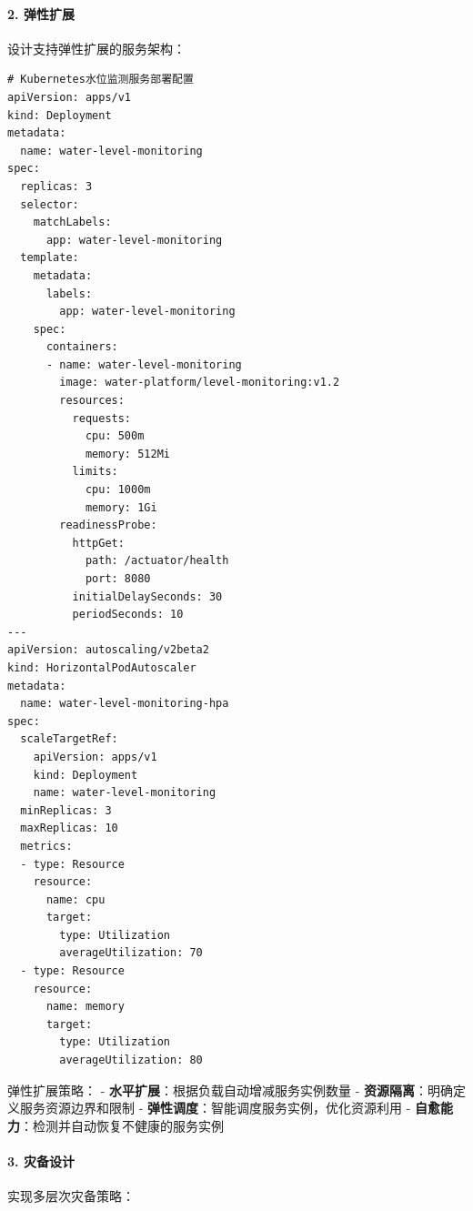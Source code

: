 \paragraph{2. 弹性扩展}\label{ux5f39ux6027ux6269ux5c55}

设计支持弹性扩展的服务架构：

\begin{lstlisting}
# Kubernetes水位监测服务部署配置
apiVersion: apps/v1
kind: Deployment
metadata:
  name: water-level-monitoring
spec:
  replicas: 3
  selector:
    matchLabels:
      app: water-level-monitoring
  template:
    metadata:
      labels:
        app: water-level-monitoring
    spec:
      containers:
      - name: water-level-monitoring
        image: water-platform/level-monitoring:v1.2
        resources:
          requests:
            cpu: 500m
            memory: 512Mi
          limits:
            cpu: 1000m
            memory: 1Gi
        readinessProbe:
          httpGet:
            path: /actuator/health
            port: 8080
          initialDelaySeconds: 30
          periodSeconds: 10
---
apiVersion: autoscaling/v2beta2
kind: HorizontalPodAutoscaler
metadata:
  name: water-level-monitoring-hpa
spec:
  scaleTargetRef:
    apiVersion: apps/v1
    kind: Deployment
    name: water-level-monitoring
  minReplicas: 3
  maxReplicas: 10
  metrics:
  - type: Resource
    resource:
      name: cpu
      target:
        type: Utilization
        averageUtilization: 70
  - type: Resource
    resource:
      name: memory
      target:
        type: Utilization
        averageUtilization: 80
\end{lstlisting}

弹性扩展策略： - \textbf{水平扩展}：根据负载自动增减服务实例数量 -
\textbf{资源隔离}：明确定义服务资源边界和限制 -
\textbf{弹性调度}：智能调度服务实例，优化资源利用 -
\textbf{自愈能力}：检测并自动恢复不健康的服务实例

\paragraph{3. 灾备设计}\label{ux707eux5907ux8bbeux8ba1}

实现多层次灾备策略：

